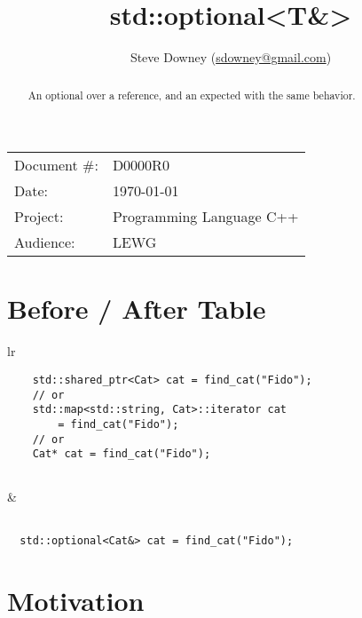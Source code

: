 \documentclass[a4paper,10pt,oneside,openany,final,article]{memoir}
\begin{document}
\title{std::optional<T\&>}
\author{
Steve Downey \small(\href{mailto:sdowney@gmail.com}{sdowney@gmail.com}) \\
}
\date{} %
\maketitle

\begin{flushright}
\begin{tabular}{ll}
  Document \#: & D0000R0 \\
  Date: & \today \\
  Project: & Programming Language C++ \\
  Audience: & LEWG
\end{tabular}
\end{flushright}

\begin{abstract}
  An optional over a reference, and an expected with the same behavior.
\end{abstract}

\tableofcontents*


\chapter{Before / After Table}
\begin{tabular}{ lr }
\begin{minipage}[t]{0.45\columnwidth}
  \begin{verbatim}
    std::shared_ptr<Cat> cat = find_cat("Fido");
    // or
    std::map<std::string, Cat>::iterator cat
        = find_cat("Fido");
    // or
    Cat* cat = find_cat("Fido");


\end{verbatim}
\end{minipage}
&
\begin{minipage}[t]{0.45\columnwidth}
\begin{verbatim}

  std::optional<Cat&> cat = find_cat("Fido");

\end{verbatim}
\end{minipage}

\end{tabular}

\chapter{Motivation}
\end{document}
